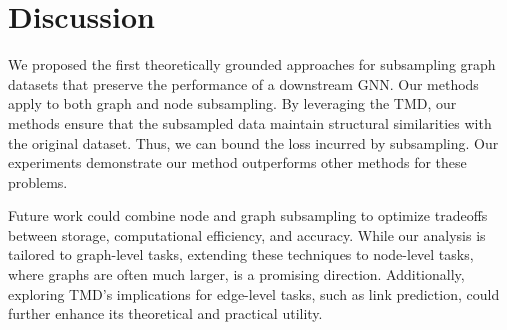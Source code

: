 \section{Discussion}

We proposed the first theoretically grounded approaches for subsampling graph datasets that preserve the performance of a downstream GNN. Our methods apply to both graph and node subsampling. By leveraging the TMD, our methods ensure that the subsampled data maintain structural similarities with the original dataset. Thus, we can bound the loss incurred by subsampling. Our experiments demonstrate our method outperforms other methods for these problems. 

Future work could combine node and graph subsampling to optimize tradeoffs between storage, computational efficiency, and accuracy. While our analysis is tailored to graph-level tasks, extending these techniques to node-level tasks, where graphs are often much larger, is a promising direction. Additionally, exploring TMD's implications for edge-level tasks, such as link prediction, could further enhance its theoretical and practical utility.